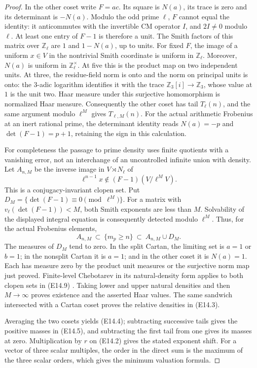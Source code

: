 \documentclass[11pt,oneside]{article}
\begin{document}
\begin{proof}
In the other coset write $F=a c$.  Its square is $N(a)$,
its trace is zero and its determinant is $-N(a)$.
Modulo the odd prime $\ell$, $F$ cannot equal the identity:
it anticommutes with the invertible CM operator $I$, and
$2I\ne0$ modulo $\ell$.  At least one entry of $F-1$ is
therefore a unit.  The Smith factors of this matrix over
$\mathbb Z_\ell$ are $1$ and $1-N(a)$, up to units.
For fixed $F$, the image of a uniform $x\in V$ in the
nontrivial Smith coordinate is uniform in $\mathbb Z_\ell$.
Moreover, $N(a)$ is uniform in $\mathbb Z_\ell^\times$.
At five this is the product map on two independent units.
At three, the residue-field norm is onto and the norm on
principal units is onto: the $3$-adic logarithm identifies it
with the trace $\mathbb Z_3[i]\to\mathbb Z_3$, whose value at
$1$ is the unit two.  Haar measure under this surjective
homomorphism is normalized Haar measure.
Consequently the other coset has tail $T_\ell(n)$, and the
same argument modulo $\ell^M$ gives $T_{\ell,M}(n)$.
For the actual arithmetic Frobenius at an inert rational
prime, the determinant identity reads $N(a)=-p$ and
$\det(F-1)=p+1$, retaining the sign in this calculation.

For completeness the passage to prime density uses finite
quotients with a vanishing error, not an interchange of an
uncontrolled infinite union with density.
Let $A_{n,M}$ be the inverse image in $V\rtimes N_\ell$ of
\[
 \ell^{n-1}x\notin(F-1)(V/\ell^M V).
\]
This is a conjugacy-invariant clopen set.  Put
$D_M=\{\det(F-1)\equiv0\pmod{\ell^M}\}$.
For a matrix with $v_\ell(\det(F-1))<M$, both Smith exponents
are less than $M$.  Solvability of the displayed integral
equation is consequently detected modulo $\ell^M$.
Thus, for the actual Frobenius elements,
\[
 A_{n,M}\ \subset\ \{m_p\ge n\}\ \subset\ A_{n,M}\cup D_M.
 \tag{E14.9}
\]
The measures of $D_M$ tend to zero.  In the split Cartan,
the limiting set is $a=1$ or $b=1$; in the nonsplit Cartan
it is $a=1$; and in the other coset it is $N(a)=1$.
Each has measure zero by the product unit measures or the
surjective norm map just proved.  Finite-level Chebotarev
in its natural-density form applies to both clopen sets in
(E14.9) \cite[\S2.1, Theorem 1, and equations (8)--(9)]{E_density_Serre}.
Taking lower and upper natural densities and then $M\to\infty$
proves existence and the asserted Haar values.  The same
sandwich intersected with a Cartan coset proves the relative
densities in (E14.3).

Averaging the two cosets yields (E14.4); subtracting successive
tails gives the positive masses in (E14.5), and subtracting the
first tail from one gives its masses at zero.
Multiplication by $r$ on (E14.2) gives the stated exponent
shift.  For a vector of three scalar multiples, the order in
the direct sum is the maximum of the three scalar orders,
which gives the minimum valuation formula.


\end{proof}
\end{document}
